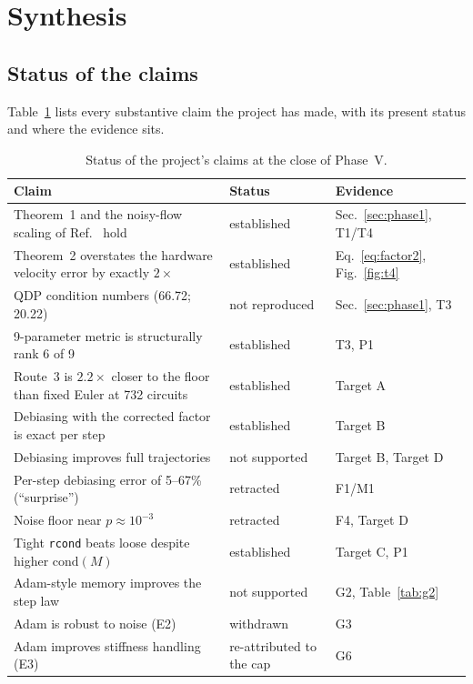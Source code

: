 \documentclass[aps,pra,reprint,superscriptaddress,nofootinbib]{revtex4-2}
\newcommand{\cond}{\mathrm{cond}}
\newcommand{\rcond}{\texttt{rcond}}
\begin{document}
\section{Synthesis}
\label{sec:synthesis}

\subsection{Status of the claims}

Table~\ref{tab:claims} lists every substantive claim the project has made, with its present
status and where the evidence sits.

\begin{table}[t]
\caption{Status of the project's claims at the close of Phase~V.}
\label{tab:claims}
\begin{ruledtabular}
\begin{tabular}{p{9.2cm}p{2.6cm}p{3.6cm}}
Claim & Status & Evidence \\
\midrule
Theorem~1 and the noisy-flow scaling of Ref.~\cite{QDP2024} hold & established & Sec.~\ref{sec:phase1}, T1/T4 \\
Theorem~2 overstates the hardware velocity error by exactly $2\times$ & established & Eq.~\eqref{eq:factor2}, Fig.~\ref{fig:t4} \\
QDP condition numbers (66.72; 20.22) & not reproduced & Sec.~\ref{sec:phase1}, T3 \\
9-parameter metric is structurally rank 6 of 9 & established & T3, P1 \\
Route~3 is $2.2\times$ closer to the floor than fixed Euler at 732 circuits & established & Target A \\
Debiasing with the corrected factor is exact per step & established & Target B \\
Debiasing improves full trajectories & not supported & Target B, Target D \\
Per-step debiasing error of 5--67\% (``surprise'') & retracted & F1/M1 \\
Noise floor near $p\approx10^{-3}$ & retracted & F4, Target D \\
Tight \rcond{} beats loose despite higher $\cond(M)$ & established & Target C, P1 \\
Adam-style memory improves the step law & not supported & G2, Table~\ref{tab:g2} \\
Adam is robust to noise (E2) & withdrawn & G3 \\
Adam improves stiffness handling (E3) & re-attributed to the cap & G6 \\

\end{tabular}
\end{ruledtabular}
\end{table}
\end{document}
